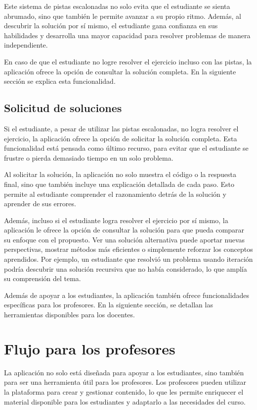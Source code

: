 \documentclass{article}
\begin{document}
Este sistema de pistas escalonadas no solo evita que el estudiante se sienta abrumado, sino que también le permite avanzar a su propio ritmo. Además, al descubrir la solución por sí mismo, el estudiante gana confianza en sus habilidades y desarrolla una mayor capacidad para resolver problemas de manera independiente.

En caso de que el estudiante no logre resolver el ejercicio incluso con las pistas, la aplicación ofrece la opción de consultar la solución completa. En la siguiente sección se explica esta funcionalidad.

\subsection{Solicitud de soluciones}

Si el estudiante, a pesar de utilizar las pistas escalonadas, no logra resolver el ejercicio, la aplicación ofrece la opción de solicitar la solución completa. Esta funcionalidad está pensada como último recurso, para evitar que el estudiante se frustre o pierda demasiado tiempo en un solo problema.

Al solicitar la solución, la aplicación no solo muestra el código o la respuesta final, sino que también incluye una explicación detallada de cada paso. Esto permite al estudiante comprender el razonamiento detrás de la solución y aprender de sus errores.

Además, incluso si el estudiante logra resolver el ejercicio por sí mismo, la aplicación le ofrece la opción de consultar la solución para que pueda comparar su enfoque con el propuesto. Ver una solución alternativa puede aportar nuevas perspectivas, mostrar métodos más eficientes o simplemente reforzar los conceptos aprendidos. Por ejemplo, un estudiante que resolvió un problema usando iteración podría descubrir una solución recursiva que no había considerado, lo que amplía su comprensión del tema.

Además de apoyar a los estudiantes, la aplicación también ofrece funcionalidades específicas para los profesores. En la siguiente sección, se detallan las herramientas disponibles para los docentes.

\section{Flujo para los profesores}\label{sec:teachers}

La aplicación no solo está diseñada para apoyar a los estudiantes, sino también para ser una herramienta útil para los profesores. Los profesores pueden utilizar la plataforma para crear y gestionar contenido, lo que les permite enriquecer el material disponible para los estudiantes y adaptarlo a las necesidades del curso.
\end{document}
